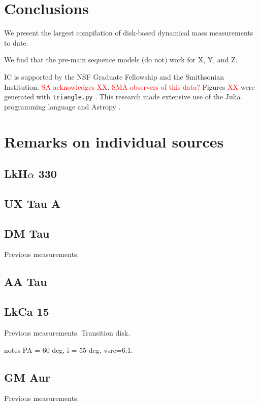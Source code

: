 \documentclass[iop,floatfix,numberedappendix,twocolappendix]{emulateapj}
\newcommand{\todo}[1]{ \textcolor{red}{#1}}
\begin{document}
\section{Conclusions}

We present the largest compilation of disk-based dynamical mass measurements to date. 

We find that the pre-main sequence models (do not) work for X, Y, and Z.

\acknowledgments
IC is supported by the NSF Graduate Fellowship and the Smithsonian Institution. \todo{SA acknowledges XX}. \todo{SMA observers of this data?}  Figures \todo{XX} were generated with \texttt{triangle.py} \citep{foreman-mackey14}. This research made extensive use of the Julia programming language \citep{julia12} and Astropy \citep{astropy13}.




\appendix

\section{Remarks on individual sources}

\subsection{LkH$\alpha$ 330}


\subsection{UX Tau A}

\subsection{DM Tau}
Previous measurements.

\subsection{AA Tau}

\subsection{LkCa 15}
Previous measurements. Transition disk.

\citep{vandermarel15} notes PA = 60 deg, i = 55 deg,  vsrc=6.1.

\subsection{GM Aur}
Previous measurements.
\end{document}
